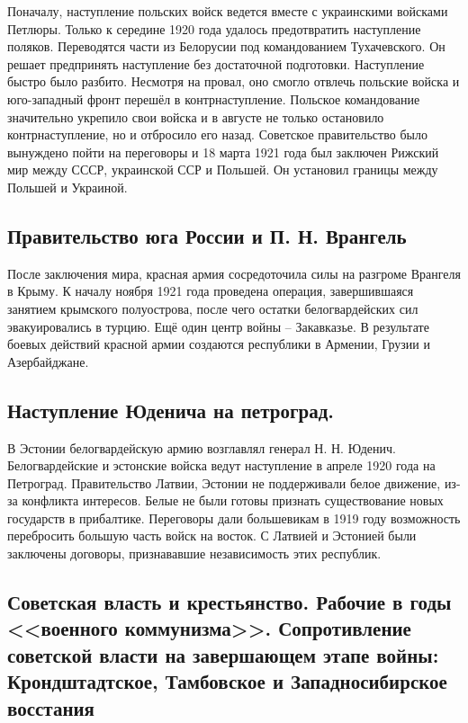 Поначалу, наступление польских войск ведется вместе с украинскими войсками Петлюры. Только к середине 1920 года удалось предотвратить наступление поляков. Переводятся части из Белорусии под командованием Тухачевского. Он решает предпринять наступление без достаточной подготовки. Наступление быстро было разбито. Несмотря на провал, оно смогло отвлечь польские войска и юго-западный фронт перешёл в контрнаступление. 
Польское командование значительно укрепило свои войска и в августе не только остановило контрнаступление, но и отбросило его назад. Советское правительство было вынуждено пойти на переговоры и 18 марта 1921 года был заключен Рижский мир между СССР, украинской ССР и Польшей. Он установил границы между Польшей и Украиной.

\subsection{Правительство юга России и П. Н. Врангель}

После заключения мира, красная армия сосредоточила силы на разгроме Врангеля в Крыму. К началу ноября 1921 года проведена операция, завершившаяся занятием крымского полуострова, после чего остатки белогвардейских сил эвакуировались в турцию.
Ещё один центр войны – Закавказье. В результате боевых действий красной армии создаются республики в Армении, Грузии и Азербайджане.

\subsection{Наступление Юденича на петроград.}

В Эстонии белогвардейскую армию возглавлял генерал Н. Н. Юденич.
Белогвардейские и эстонские войска ведут наступление в апреле 1920 года на Петроград.
Правительство Латвии, Эстонии не поддерживали белое движение, из-за конфликта интересов. Белые не были готовы признать существование новых государств в прибалтике. Переговоры дали  большевикам в 1919 году возможность перебросить большую часть войск на восток. С Латвией и Эстонией были заключены договоры, признававшие независимость этих республик.

\subsection{Советская власть и крестьянство. Рабочие в годы <<военного коммунизма>>. Сопротивление советской власти на завершающем этапе войны: Крондштадтское, Тамбовское и Западносибирское восстания}

